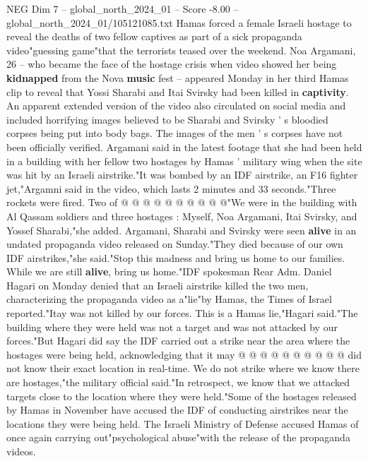 \begin{textsample}{NEG Dim 7 – global\_north\_2024\_01 – Score -8.00 – global\_north\_2024\_01/105121085.txt}  \label{ex:f7_neg_208}
Hamas forced a female Israeli hostage to reveal the deaths of two fellow captives as part of a sick propaganda video"guessing game"that the terrorists teased over the weekend.
Noa Argamani, 26 -- who became the face of the hostage crisis when video showed her being \textbf{kidnapped} from the Nova \textbf{music} fest -- appeared Monday in her third Hamas clip to reveal that Yossi Sharabi and Itai Svirsky had been killed in \textbf{captivity}.
An apparent extended version of the video also circulated on social media and included horrifying images believed to be Sharabi and Svirsky ' s bloodied corpses being put into body bags.
The images of the men ' s corpses have not been officially verified.
Argamani said in the latest footage that she had been held in a building with her fellow two hostages by Hamas ' military wing when the site was hit by an Israeli airstrike."It was bombed by an IDF airstrike, an F16 fighter jet,"Argamni said in the video, which lasts 2 minutes and 33 seconds."Three rockets were fired.
Two of @ @ @ @ @ @ @ @ @ @"We were in the building with Al Qassam soldiers and three hostages : Myself, Noa Argamani, Itai Svirsky, and Yossef Sharabi,"she added.
Argamani, Sharabi and Svirsky were seen \textbf{alive} in an undated propaganda video released on Sunday."They died because of our own IDF airstrikes,"she said."Stop this madness and bring us home to our families.
While we are still \textbf{alive}, bring us home."IDF spokesman Rear Adm.
Daniel Hagari on Monday denied that an Israeli airstrike killed the two men, characterizing the propaganda video as a"lie"by Hamas, the Times of Israel reported."Itay was not killed by our forces.
This is a Hamas lie,"Hagari said."The building where they were held was not a target and was not attacked by our forces."But Hagari did say the IDF carried out a strike near the area where the hostages were being held, acknowledging that it may @ @ @ @ @ @ @ @ @ @ did not know their exact location in real-time.
We do not strike where we know there are hostages,"the military official said."In retrospect, we know that we attacked targets close to the location where they were held."Some of the hostages released by Hamas in November have accused the IDF of conducting airstrikes near the locations they were being held.
The Israeli Ministry of Defense accused Hamas of once again carrying out"psychological abuse"with the release of the propaganda videos.

\end{textsample}
